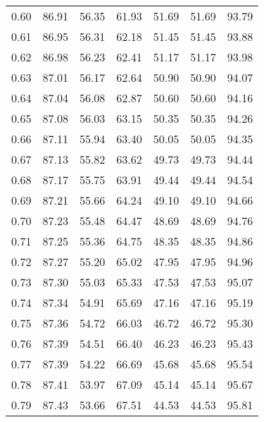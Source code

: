 \begin{tabular}{|c|c|c|c|c|c|c|}
      0.60 &     86.91 &     56.35 &      61.93 &   51.69 &      51.69 &         93.79 \\
      0.61 &     86.95 &     56.31 &      62.18 &   51.45 &      51.45 &         93.88 \\
      0.62 &     86.98 &     56.23 &      62.41 &   51.17 &      51.17 &         93.98 \\
      0.63 &     87.01 &     56.17 &      62.64 &   50.90 &      50.90 &         94.07 \\
      0.64 &     87.04 &     56.08 &      62.87 &   50.60 &      50.60 &         94.16 \\
      0.65 &     87.08 &     56.03 &      63.15 &   50.35 &      50.35 &         94.26 \\
      0.66 &     87.11 &     55.94 &      63.40 &   50.05 &      50.05 &         94.35 \\
      0.67 &     87.13 &     55.82 &      63.62 &   49.73 &      49.73 &         94.44 \\
      0.68 &     87.17 &     55.75 &      63.91 &   49.44 &      49.44 &         94.54 \\
      0.69 &     87.21 &     55.66 &      64.24 &   49.10 &      49.10 &         94.66 \\
      0.70 &     87.23 &     55.48 &      64.47 &   48.69 &      48.69 &         94.76 \\
      0.71 &     87.25 &     55.36 &      64.75 &   48.35 &      48.35 &         94.86 \\
      0.72 &     87.27 &     55.20 &      65.02 &   47.95 &      47.95 &         94.96 \\
      0.73 &     87.30 &     55.03 &      65.33 &   47.53 &      47.53 &         95.07 \\
      0.74 &     87.34 &     54.91 &      65.69 &   47.16 &      47.16 &         95.19 \\
      0.75 &     87.36 &     54.72 &      66.03 &   46.72 &      46.72 &         95.30 \\
      0.76 &     87.39 &     54.51 &      66.40 &   46.23 &      46.23 &         95.43 \\
      0.77 &     87.39 &     54.22 &      66.69 &   45.68 &      45.68 &         95.54 \\
      0.78 &     87.41 &     53.97 &      67.09 &   45.14 &      45.14 &         95.67 \\
      0.79 &     87.43 &     53.66 &      67.51 &   44.53 &      44.53 &         95.81 \\

\end{tabular}
